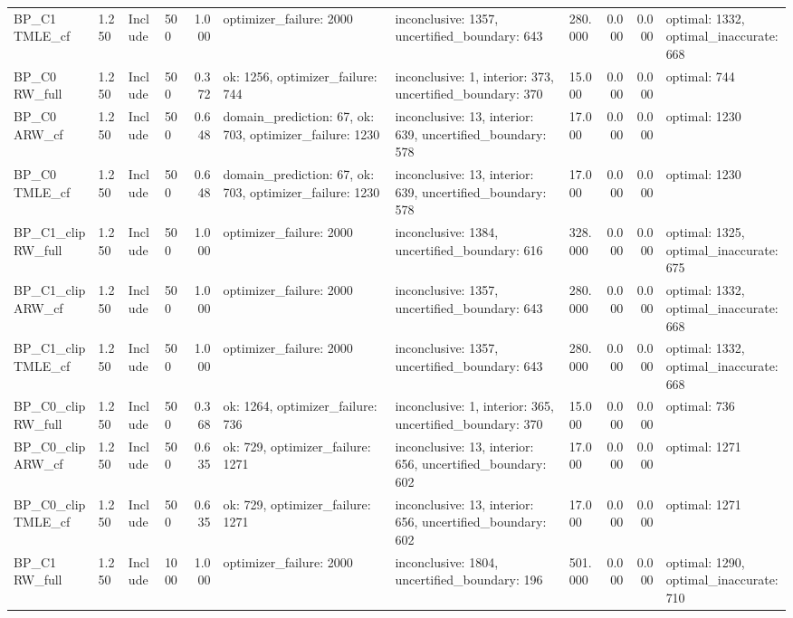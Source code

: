 \begin{tabular}{llllrlllrrl}
BP\_C1 TMLE\_cf & 1.250 & Include & 500 & 1.000 & optimizer\_failure: 2000 & inconclusive: 1357, uncertified\_boundary: 643 & 280.000 & 0.000 & 0.000 & optimal: 1332, optimal\_inaccurate: 668 \\
BP\_C0 RW\_full & 1.250 & Include & 500 & 0.372 & ok: 1256, optimizer\_failure: 744 & inconclusive: 1, interior: 373, uncertified\_boundary: 370 & 15.000 & 0.000 & 0.000 & optimal: 744 \\
BP\_C0 ARW\_cf & 1.250 & Include & 500 & 0.648 & domain\_prediction: 67, ok: 703, optimizer\_failure: 1230 & inconclusive: 13, interior: 639, uncertified\_boundary: 578 & 17.000 & 0.000 & 0.000 & optimal: 1230 \\
BP\_C0 TMLE\_cf & 1.250 & Include & 500 & 0.648 & domain\_prediction: 67, ok: 703, optimizer\_failure: 1230 & inconclusive: 13, interior: 639, uncertified\_boundary: 578 & 17.000 & 0.000 & 0.000 & optimal: 1230 \\
BP\_C1\_clip RW\_full & 1.250 & Include & 500 & 1.000 & optimizer\_failure: 2000 & inconclusive: 1384, uncertified\_boundary: 616 & 328.000 & 0.000 & 0.000 & optimal: 1325, optimal\_inaccurate: 675 \\
BP\_C1\_clip ARW\_cf & 1.250 & Include & 500 & 1.000 & optimizer\_failure: 2000 & inconclusive: 1357, uncertified\_boundary: 643 & 280.000 & 0.000 & 0.000 & optimal: 1332, optimal\_inaccurate: 668 \\
BP\_C1\_clip TMLE\_cf & 1.250 & Include & 500 & 1.000 & optimizer\_failure: 2000 & inconclusive: 1357, uncertified\_boundary: 643 & 280.000 & 0.000 & 0.000 & optimal: 1332, optimal\_inaccurate: 668 \\
BP\_C0\_clip RW\_full & 1.250 & Include & 500 & 0.368 & ok: 1264, optimizer\_failure: 736 & inconclusive: 1, interior: 365, uncertified\_boundary: 370 & 15.000 & 0.000 & 0.000 & optimal: 736 \\
BP\_C0\_clip ARW\_cf & 1.250 & Include & 500 & 0.635 & ok: 729, optimizer\_failure: 1271 & inconclusive: 13, interior: 656, uncertified\_boundary: 602 & 17.000 & 0.000 & 0.000 & optimal: 1271 \\
BP\_C0\_clip TMLE\_cf & 1.250 & Include & 500 & 0.635 & ok: 729, optimizer\_failure: 1271 & inconclusive: 13, interior: 656, uncertified\_boundary: 602 & 17.000 & 0.000 & 0.000 & optimal: 1271 \\
BP\_C1 RW\_full & 1.250 & Include & 1000 & 1.000 & optimizer\_failure: 2000 & inconclusive: 1804, uncertified\_boundary: 196 & 501.000 & 0.000 & 0.000 & optimal: 1290, optimal\_inaccurate: 710 \\

\end{tabular}
